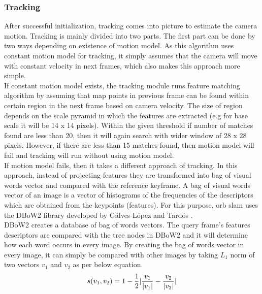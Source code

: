 \subsubsection{Tracking}
After successful initialization, tracking comes into picture to estimate the camera motion.
Tracking is mainly divided into two parts. The first part can be done by two ways depending on existence of motion model. As this algorithm uses constant motion model for tracking, it simply assumes that the camera will move with constant velocity in next frames, which also makes this approach more simple. \\
\linebreak
If constant motion model exists, the tracking module runs feature matching algorithm by assuming that map points in previous frame can be found within certain region in the next frame based on camera velocity. The size of region depends on the scale pyramid in which the features are extracted (e.g for base scale it will be 14 x 14 pixels). Within the given threshold if number of matches found are less than 20, then it will again search with wider window of 28 x 28 pixels. However, if there are less than 15 matches found, then motion model will fail and tracking will run without using motion model.\\
\linebreak
If motion model fails, then it takes a different approach of tracking. In this approach, instead of projecting features they are transformed into bag of visual words vector and compared with the reference keyframe. A bag of visual words vector of an image is a vector of histograms of the frequencies of the descriptors which are obtained from the keypoints (features). For this purpose, \acrshort{orb} \acrshort{slam} uses the DBoW2 library developed by Gálves-López and Tardós \cite{DboW}. \\
\linebreak
DBoW2 creates a database of bag of words vectors. The query frame's features descriptors are compared with the tree nodes in DBoW2 and it will determine how each word occurs in every image. By creating the bag of words vector in every image, it can simply be compared with other images by taking $ L_{1} $ norm of two vectors $ v_{1} $ and $ v_{2} $  as per below equation.
\begin{equation*}
s(v_{1},v_{2}) = 1 - \frac{1}{2} \arrowvert \frac{v_{1}}{|v_{1}|} - \frac{v_{2}}{|v_{2}|} \arrowvert 
\label{norm}
\end{equation*}  
\linebreak 
